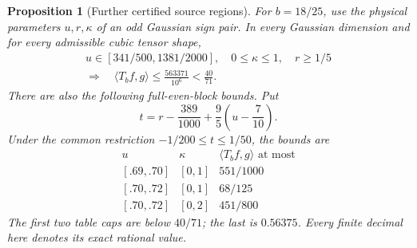 \documentclass[11pt]{article}
\newtheorem{proposition}[theorem]{Proposition}
\begin{document}
\begin{proposition}[Further certified source regions]
\label{prop:r3-additional-source-regions}
For $b=18/25$, use the physical parameters $u,r,\kappa$ of an odd
Gaussian sign pair.  In every Gaussian dimension and for every
admissible cubic tensor shape,
\begin{gather*}
 u\in[341/500,1381/2000],\quad 0\leq\kappa\leq1,
 \quad r\geq1/5\\
 \Longrightarrow\quad
 \langle T_bf,g\rangle\leq\frac{563371}{10^6}<\frac{40}{71}.
\end{gather*}
There are also the following full-even-block bounds.  Put
\[
 t=r-\frac{389}{1000}+\frac95\left(u-\frac7{10}\right).
\]
Under the common restriction $-1/200\leq t\leq1/50$, the bounds are
\[
\begin{array}{c|c|c}
 u&\kappa&\langle T_bf,g\rangle\text{ at most}\\\hline
 {[.69,.70]}&[0,1]&551/1000\\
 {[.70,.72]}&[0,1]&68/125\\
 {[.70,.72]}&[0,2]&451/800
\end{array}
\]
The first two table caps are below $40/71$; the last is $0.56375$.
Every finite decimal here denotes its exact rational value.
\end{proposition}
\end{document}
